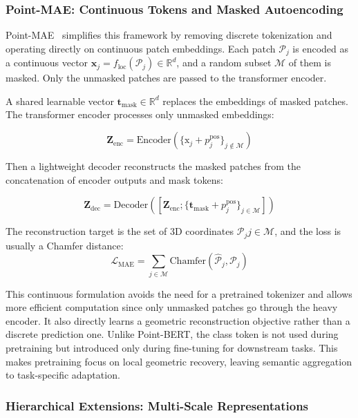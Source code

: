 \subsubsection{Point-MAE: Continuous Tokens and Masked Autoencoding}
\label{sssec:pointmae}

Point-MAE~\cite{pmae} simplifies this framework by removing discrete tokenization and operating directly on continuous patch embeddings. Each patch $\mathcal{P}_j$ is encoded as a continuous vector $\mathbf{x}_j = f_{\text{loc}}(\mathcal{P}_j) \in \mathbb{R}^{d}$, and a random subset $\mathcal{M}$ of them is masked. Only the unmasked patches are passed to the transformer encoder.

A shared learnable vector $\mathbf{t}_{\text{mask}} \in \mathbb{R}^d$ replaces the embeddings of masked patches. The transformer encoder processes only unmasked embeddings:

\begin{equation}
  \mathbf{Z}_\text{enc}=\text{Encoder}(\{\text{x}_j+p_j^\text{pos}\}_{j \notin \mathcal{M}})
\end{equation}

Then a lightweight decoder reconstructs the masked patches from the concatenation of encoder outputs and mask tokens:

\begin{equation}
  \mathbf{Z}_\text{dec}=\text{Decoder}([\mathbf{Z}_\text{enc}; \{\mathbf{t}_{\text{mask}}+p_j^\text{pos}\}_{j \in \mathcal{M}}])
\end{equation}

The reconstruction target is the set of 3D coordinates ${\mathcal{P}_j}{j \in \mathcal{M}}$, and the loss is usually a Chamfer distance:
\begin{equation}
  \mathcal{L}_{\text{MAE}} = \sum_{j \in \mathcal{M}} \text{Chamfer}(\hat{\mathcal{P}}_j, \mathcal{P}_j)
\end{equation}

This continuous formulation avoids the need for a pretrained tokenizer and allows more efficient computation since only unmasked patches go through the heavy encoder. It also directly learns a geometric reconstruction objective rather than a discrete prediction one. Unlike Point-BERT, the class token is not used during pretraining but introduced only during fine-tuning for downstream tasks. This makes pretraining focus on local geometric recovery, leaving semantic aggregation to task-specific adaptation.

\subsubsection{Hierarchical Extensions: Multi-Scale Representations}
\label{sssec:hierarchical_extensions}

